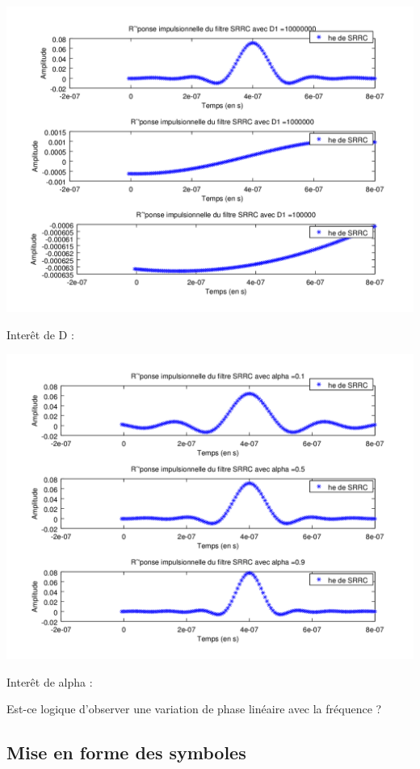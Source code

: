 \documentclass{acm_proc_article-sp}
\begin{document}
\begin{center}
\includegraphics[scale=0.45]{SRRC_varD_3.png}
\end{center}

Interêt de D : 

\begin{center}
\includegraphics[scale=0.45]{SRRC_varAlpha_3.png}
\end{center}

Interêt de alpha :

Est-ce logique d'observer une variation de phase linéaire avec la fréquence ?

\subsection{Mise en forme des symboles}
\end{document}
